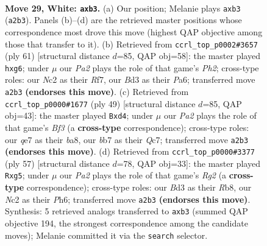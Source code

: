 \documentclass[11pt]{article}
\begin{document}
\clearpage

\begin{figure}[p]\centering
\begin{subfigure}{0.46\textwidth}\centering
\resizebox{\linewidth}{!}{%
\newchessgame
\chessboard[
  setfen={r2k2nr/1b2q3/8/4Pp2/p4Q1p/1p1B3P/P1N3P1/2R3KR w - - 0 29},
  showmover=false,
  pgfstyle=straightmove, color=movearrow, markmove={a2-b3}
]}
\caption{}
\end{subfigure}\hfill
\begin{subfigure}{0.46\textwidth}\centering
\resizebox{\linewidth}{!}{%
\newchessgame
\chessboard[
  setfen={3rk3/3p1r1p/p4PP1/1p2q1B1/1P2b3/4N3/3R2PP/3Q2K1 b - - 0 31},
  showmover=false,
  pgfstyle=straightmove, color=movearrow, markmove={h7-g6}
]}
\caption{}
\end{subfigure}
\\[4pt]
\begin{subfigure}{0.46\textwidth}\centering
\resizebox{\linewidth}{!}{%
\newchessgame
\chessboard[
  setfen={B4rk1/2q2p2/4pb1p/n5p1/3N3P/2P3P1/2Q2P2/2B2RK1 b - - 0 25},
  showmover=false,
  pgfstyle=straightmove, color=movearrow, markmove={f6-d4}
]}
\caption{}
\end{subfigure}\hfill
\begin{subfigure}{0.46\textwidth}\centering
\resizebox{\linewidth}{!}{%
\newchessgame
\chessboard[
  setfen={1r6/p4qrk/1p1p3p/5bP1/1PPQ4/P5B1/3K1P2/2R3R1 b - - 0 29},
  showmover=false,
  pgfstyle=straightmove, color=movearrow, markmove={g7-g5}
]}
\caption{}
\end{subfigure}
\caption{\textbf{Move 29, White: \texttt{axb3}.} (a) Our position; Melanie plays \texttt{axb3} (\texttt{a2b3}). Panels (b)--(d) are the retrieved master positions whose correspondence most drove this move (highest QAP objective among those that transfer to it). (b) Retrieved from \texttt{ccrl\_top\_p0002\#3657} (ply 61) [structural distance $d$=85, QAP obj=58]: the master played \texttt{hxg6}; under $\mu$ our \emph{Pa2} plays the role of that game's \emph{Ph2}; cross-type roles: our \emph{N}c2 as their \emph{R}f7, our \emph{B}d3 as their \emph{P}a6; transferred move \texttt{a2b3} \textbf{(endorses this move)}. (c) Retrieved from \texttt{ccrl\_top\_p0000\#1677} (ply 49) [structural distance $d$=85, QAP obj=43]: the master played \texttt{Bxd4}; under $\mu$ our \emph{Pa2} plays the role of that game's \emph{Bf3} (a \textbf{cross-type} correspondence); cross-type roles: our \emph{q}e7 as their \emph{b}a8, our \emph{b}b7 as their \emph{Q}c7; transferred move \texttt{a2b3} \textbf{(endorses this move)}. (d) Retrieved from \texttt{ccrl\_top\_p0000\#3377} (ply 57) [structural distance $d$=78, QAP obj=33]: the master played \texttt{Rxg5}; under $\mu$ our \emph{Pa2} plays the role of that game's \emph{Rg2} (a \textbf{cross-type} correspondence); cross-type roles: our \emph{B}d3 as their \emph{R}b8, our \emph{N}c2 as their \emph{P}h6; transferred move \texttt{a2b3} \textbf{(endorses this move)}. Synthesis: 5 retrieved analogs transferred to \texttt{axb3} (summed QAP objective 194, the strongest correspondence among the candidate moves); Melanie committed it via the \texttt{search} selector.}
\label{fig:thought-m56}
\end{figure}
\end{document}
